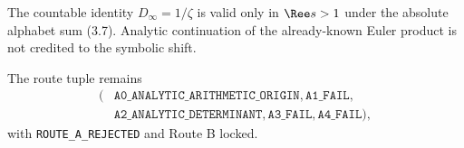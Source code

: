 The countable identity $D_\infty=1/\zeta$ is valid only in $\Ree s>1$ under
the absolute alphabet sum (3.7).  Analytic continuation of the already-known
Euler product is not credited to the symbolic shift.

The route tuple remains
\[
\begin{split}
(&\texttt{A0\_ANALYTIC\_ARITHMETIC\_ORIGIN},
  \texttt{A1\_FAIL},\\
 &\texttt{A2\_ANALYTIC\_DETERMINANT},
  \texttt{A3\_FAIL},\texttt{A4\_FAIL}),
\end{split}
\]
with \texttt{ROUTE\_A\_REJECTED} and Route B locked.
